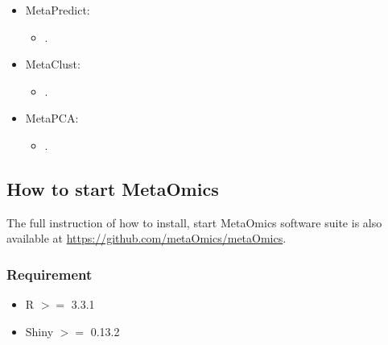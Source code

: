 \begin{itemize}
\item MetaPredict: 
\begin{itemize}
\item {}.
\end{itemize}

\item MetaClust: 
\begin{itemize}
\item {}.
\end{itemize}

\item MetaPCA: 

\begin{itemize}
\item {}.
\end{itemize}

\end{itemize}



\subsection{How to start MetaOmics}

The full instruction of how to install, start MetaOmics software suite is also available at \url{https://github.com/metaOmics/metaOmics}.


\subsubsection{Requirement}
\begin{itemize}
\item R $>=$ 3.3.1
\item Shiny $>=$ 0.13.2
\end{itemize}




